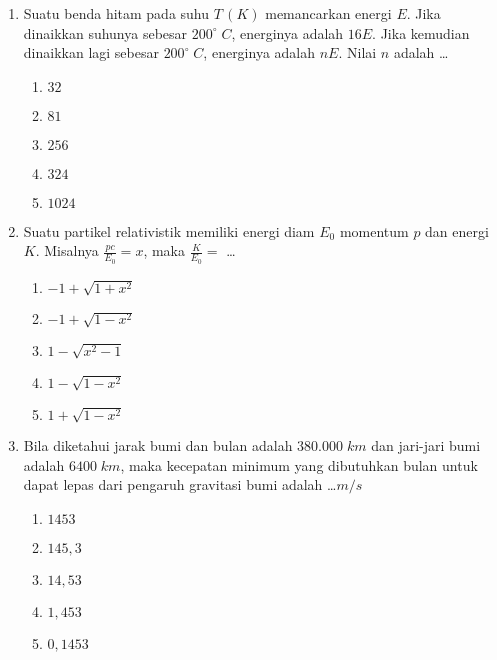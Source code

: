 \documentclass[A4,12PT, english, twocolumn]{journal}
\begin{document}
\begin{enumerate}
\item Suatu benda hitam pada suhu $T \, (K)$ memancarkan energi $E$. Jika dinaikkan suhunya sebesar $200^\circ \; C$, energinya adalah $16E$. Jika kemudian dinaikkan lagi sebesar $200^\circ \; C$, energinya adalah $nE$. Nilai $n$ adalah \dots
    \begin{enumerate}
        \item $32$
        \item $81$
        \item $256$
        \item $324$
        \item $1024$
    \end{enumerate}

\item Suatu partikel relativistik memiliki  energi diam $E_0$ momentum $p$ dan energi $K$. Misalnya $\frac{pc}{E_0}=x$, maka $\frac{K}{E_0}=$ \dots
    \begin{enumerate}
        \item $-1+ \sqrt{1+x^2}$
        \item $-1+ \sqrt{1-x^2}$
        \item $1- \sqrt{x^2-1}$
        \item $1- \sqrt{1-x^2}$
        \item $1+ \sqrt{1-x^2}$
    \end{enumerate}

\item Bila diketahui jarak bumi dan bulan adalah $380.000 \; km$ dan jari-jari bumi adalah $6400 \; km$, maka kecepatan minimum yang dibutuhkan bulan untuk dapat lepas dari pengaruh gravitasi bumi adalah \dots $m/s$
    \begin{enumerate}
        \item $1453$
        \item $145,3$
        \item $14,53$
        \item $1,453$
        \item $0,1453$
    \end{enumerate}

\end{enumerate}
\end{document}

